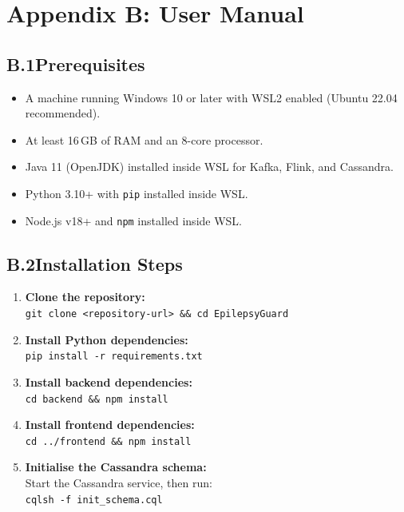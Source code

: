 \documentclass[12pt, a4paper, oneside]{report}
\begin{document}
\chapter*{Appendix B: User Manual}

\section*{B.1\quad Prerequisites}
\begin{itemize}
    \item A machine running Windows 10 or later with WSL2 enabled (Ubuntu 22.04 recommended).
    \item At least 16\,GB of RAM and an 8-core processor.
    \item Java 11 (OpenJDK) installed inside WSL for Kafka, Flink, and Cassandra.
    \item Python 3.10+ with \texttt{pip} installed inside WSL.
    \item Node.js v18+ and \texttt{npm} installed inside WSL.
\end{itemize}

\section*{B.2\quad Installation Steps}
\begin{enumerate}
    \item \textbf{Clone the repository:} \\
    \texttt{git clone <repository-url> \&\& cd EpilepsyGuard}
    \item \textbf{Install Python dependencies:} \\
    \texttt{pip install -r requirements.txt}
    \item \textbf{Install backend dependencies:} \\
    \texttt{cd backend \&\& npm install}
    \item \textbf{Install frontend dependencies:} \\
    \texttt{cd ../frontend \&\& npm install}
    \item \textbf{Initialise the Cassandra schema:} \\
    Start the Cassandra service, then run: \\
    \texttt{cqlsh -f init\_schema.cql}
\end{enumerate}
\end{document}
